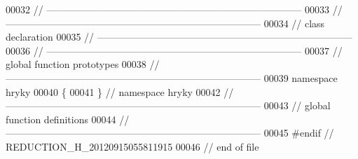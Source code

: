 \begin{DoxyCode}
00032 \textcolor{comment}{//
      ------------------------------------------------------------------------------}
00033 \textcolor{comment}{//
      ------------------------------------------------------------------------------}
00034 \textcolor{comment}{// class declaration}
00035 \textcolor{comment}{//
      ------------------------------------------------------------------------------}
00036 \textcolor{comment}{//
      ------------------------------------------------------------------------------}
00037 \textcolor{comment}{// global function prototypes}
00038 \textcolor{comment}{//
      ------------------------------------------------------------------------------}
00039 \textcolor{keyword}{namespace }hryky
00040 \{
00041 \} \textcolor{comment}{// namespace hryky}
00042 \textcolor{comment}{//
      ------------------------------------------------------------------------------}
00043 \textcolor{comment}{// global function definitions}
00044 \textcolor{comment}{//
      ------------------------------------------------------------------------------}
00045 \textcolor{preprocessor}{#endif // REDUCTION\_H\_20120915055811915}
00046 \textcolor{preprocessor}{}\textcolor{comment}{// end of file}
\end{DoxyCode}
